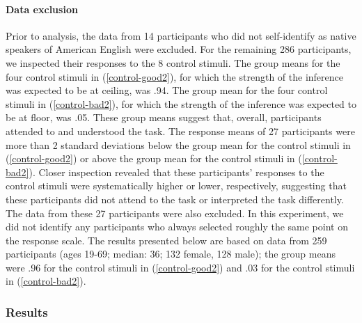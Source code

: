 \documentclass[11pt,fleqn]{article}
\newcommand{\6}{\mbox{$[\hspace*{-.6mm}[$}}
\newcommand{\9}{\mbox{$]\hspace*{-.6mm}]$}}
\begin{document}
\paragraph{Data exclusion}

Prior to analysis, the data from 14 participants who did not self-identify as native speakers of American English were excluded. For the remaining 286 participants, we inspected their responses to the 8 control stimuli. The group means for the four control stimuli in (\ref{control-good2}), for which the strength of the inference was expected to be at ceiling, was .94. The group mean for the four control stimuli in (\ref{control-bad2}), for which the strength of the inference was expected to be at floor, was .05. These group means suggest that, overall, participants attended to and understood the task. The response means of 27 participants were more than 2 standard deviations below the group mean for the control stimuli in (\ref{control-good2}) or above the group mean for the control stimuli in (\ref{control-bad2}). Closer inspection revealed that these participants' responses to the control stimuli were systematically higher or lower, respectively, suggesting that these participants did not attend to the task or interpreted the task differently. The data from these 27 participants were also excluded. In this experiment, we did not identify any participants who always selected roughly the same point on the response scale. The results presented below are based on data from 259 participants (ages 19-69; median: 36; 132 female, 128 male); the group means were .96 for the control stimuli in (\ref{control-good2}) and .03 for the control stimuli in (\ref{control-bad2}).

\subsubsection{Results}
\end{document}
